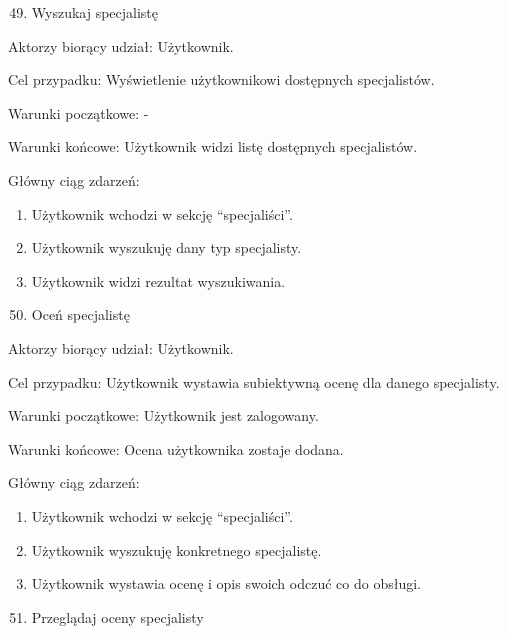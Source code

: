 \documentclass[
]{article}
\providecommand{\tightlist}{%
  \setlength{\itemsep}{0pt}\setlength{\parskip}{0pt}}
\begin{document}
{}

\begin{enumerate}
\setcounter{enumi}{48}
\tightlist
\item
  {Wyszukaj specjalistę}
\end{enumerate}

{Aktorzy biorący udział: Użytkownik.}

{Cel przypadku: Wyświetlenie użytkownikowi dostępnych specjalistów.}

{Warunki początkowe: -}

{Warunki końcowe: Użytkownik widzi listę dostępnych specjalistów.}

{Główny ciąg zdarzeń:}

\begin{enumerate}
\tightlist
\item
  {Użytkownik wchodzi w sekcję ``specjaliści''.}
\item
  {Użytkownik wyszukuję dany typ specjalisty.}
\item
  {Użytkownik widzi rezultat wyszukiwania.}
\end{enumerate}

{}

\begin{enumerate}
\setcounter{enumi}{49}
\tightlist
\item
  {Oceń specjalistę}
\end{enumerate}

{Aktorzy biorący udział: Użytkownik.}

{Cel przypadku: Użytkownik wystawia subiektywną ocenę dla danego
specjalisty.}

{Warunki początkowe: Użytkownik jest zalogowany.}

{Warunki końcowe: Ocena użytkownika zostaje dodana.}

{Główny ciąg zdarzeń:}

\begin{enumerate}
\tightlist
\item
  {Użytkownik wchodzi w sekcję ``specjaliści''.}
\item
  {Użytkownik wyszukuję konkretnego specjalistę.}
\item
  {Użytkownik wystawia ocenę i opis swoich odczuć co do obsługi.}
\end{enumerate}

{}

\begin{enumerate}
\setcounter{enumi}{50}
\tightlist
\item
  {Przeglądaj oceny specjalisty}
\end{enumerate}
\end{document}
